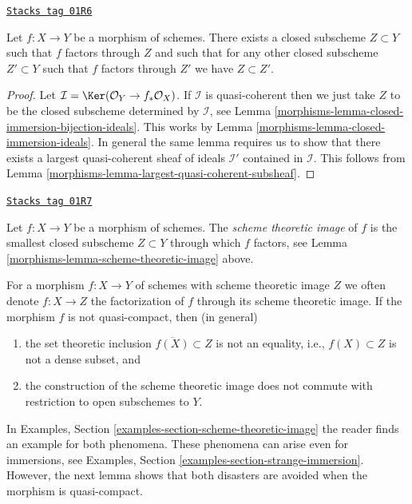 \begin{lemma}
\label{morphisms-lemma-scheme-theoretic-image}
\href{https://stacks.math.columbia.edu/tag/01R6}{\texttt{Stacks tag 01R6}}

Let $f : X \to Y$ be a morphism of schemes. There exists a closed
subscheme $Z \subset Y$ such that $f$ factors through $Z$ and such
that for any other closed subscheme $Z' \subset Y$ such that $f$
factors through $Z'$ we have $Z \subset Z'$.
\end{lemma}

\begin{proof}

Let $\mathcal{I} = \Ker(\mathcal{O}_Y \to f_*\mathcal{O}_X)$.
If $\mathcal{I}$ is quasi-coherent then we just take $Z$ to be the
closed subscheme determined by $\mathcal{I}$, see
Lemma \ref{morphisms-lemma-closed-immersion-bijection-ideals}. This works by
Lemma \ref{morphisms-lemma-closed-immersion-ideals}.
In general the same lemma requires us to show that there exists
a largest quasi-coherent sheaf of ideals $\mathcal{I}'$ contained in
$\mathcal{I}$.
This follows from Lemma \ref{morphisms-lemma-largest-quasi-coherent-subsheaf}.
\end{proof}

\begin{definition}
\label{morphisms-definition-scheme-theoretic-image}
\href{https://stacks.math.columbia.edu/tag/01R7}{\texttt{Stacks tag 01R7}}

Let $f : X \to Y$ be a morphism of schemes. The {\it scheme theoretic image}
of $f$ is the smallest closed subscheme $Z \subset Y$ through which $f$
factors, see Lemma \ref{morphisms-lemma-scheme-theoretic-image} above.
\end{definition}

For a morphism $f : X \to Y$ of schemes with scheme theoretic image $Z$
we often denote $f : X \to Z$ the factorization of $f$
through its scheme theoretic image. If the morphism $f$ is not
quasi-compact, then (in general)
\begin{enumerate}
\item the set theoretic inclusion $\overline{f(X)} \subset Z$
is not an equality, i.e., $f(X) \subset Z$ is not a dense subset, and
\item the construction of the scheme theoretic image does not commute with
restriction to open subschemes to $Y$.
\end{enumerate}
In Examples, Section \ref{examples-section-scheme-theoretic-image}
the reader finds an example for both phenomena.
These phenomena can arise even for immersions, see
Examples, Section \ref{examples-section-strange-immersion}.
However, the next lemma shows that both disasters are avoided
when the morphism is quasi-compact.

